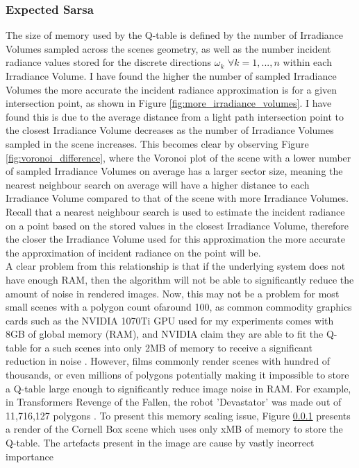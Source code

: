\documentclass[../dissertation.tex]{subfiles}
\begin{document}
\subsubsection{Expected Sarsa}

The size of memory used by the Q-table is defined by the number of Irradiance Volumes sampled across the scenes geometry, as well as the number incident radiance values stored for the discrete directions $\omega_k$ $\forall k = 1,...,n$  within each Irradiance Volume. I have found the higher the number of sampled Irradiance Volumes the more accurate the incident radiance approximation is for a given intersection point, as shown in Figure \ref{fig:more_irradiance_volumes}.  I have found this is due to the average distance from a light path intersection point to the closest Irradiance Volume decreases as the number of Irradiance Volumes sampled in the scene increases. This becomes clear by observing Figure \ref{fig:voronoi_difference}, where the Voronoi plot of the scene with a lower number of sampled Irradiance Volumes on average has a larger sector size, meaning the nearest neighbour search on average will have a higher distance to each Irradiance Volume compared to that of the scene with more Irradiance Volumes. Recall that a nearest neighbour search is used to estimate the incident radiance on a point based on the stored values in the closest Irradiance Volume, therefore the closer the Irradiance Volume used for this approximation the more accurate the approximation of incident radiance on the point will be.\\


A clear problem from this relationship is that if the underlying system does not have enough RAM, then the algorithm will not be able to significantly reduce the amount of noise in rendered images. Now, this may not be a problem for most small scenes with a polygon count ofaround 100, as common commodity graphics cards such as the NVIDIA 1070Ti GPU used for my experiments comes with 8GB of global memory (RAM), and NVIDIA claim they are able to fit the Q-table for a such scenes into only 2MB of memory to receive a significant reduction in noise \cite{dahm2017learning}. However, films commonly render scenes with hundred of thousands, or even millions of polygons potentially making it impossible to store a Q-table large enough to significantly reduce image noise in RAM. For example, in Transformers Revenge of the Fallen, the robot 'Devastator' was made out of 11,716,127 polygons \cite{devastator}. To present this memory scaling issue, Figure \ref{} presents a render of the Cornell Box scene which uses only xMB of memory to store the Q-table. The artefacts present in the image are cause by vastly incorrect importance\\
\end{document}

